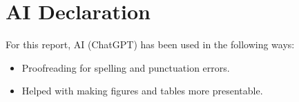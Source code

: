 \chapter{AI Declaration}

For this report, AI (ChatGPT) has been used in the following ways:
\begin{itemize}
    \item Proofreading for spelling and punctuation errors.
    \item Helped with making figures and tables more presentable.
\end{itemize}
